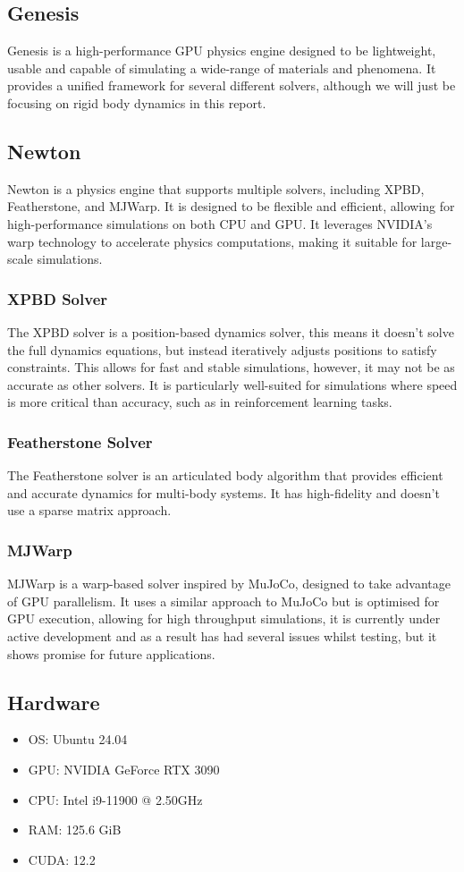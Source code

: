 \documentclass[11pt,a4paper]{article}
\begin{document}
\subsection{Genesis}
Genesis is a high-performance GPU physics engine designed to be lightweight, usable and capable of simulating a wide-range of materials and phenomena. It provides a unified framework for several different solvers, although we will just be focusing on rigid body dynamics in this report. 

\subsection{Newton}
Newton is a physics engine that supports multiple solvers, including XPBD, Featherstone, and MJWarp. It is designed to be flexible and efficient, allowing for high-performance simulations on both CPU and GPU. It leverages NVIDIA's warp technology to accelerate physics computations, making it suitable for large-scale simulations.
\subsubsection{XPBD Solver}
The XPBD solver is a position-based dynamics solver, this means it doesn't solve the full dynamics equations, but instead iteratively adjusts positions to satisfy constraints. This allows for fast and stable simulations, however, it may not be as accurate as other solvers. It is particularly well-suited for simulations where speed is more critical than accuracy, such as in reinforcement learning tasks.
\subsubsection{Featherstone Solver}
The Featherstone solver is an articulated body algorithm that provides efficient and accurate dynamics for multi-body systems. It has high-fidelity and doesn't use a sparse matrix approach.
\subsubsection{MJWarp}
MJWarp is a warp-based solver inspired by MuJoCo, designed to take advantage of GPU parallelism. It uses a similar approach to MuJoCo but is optimised for GPU execution, allowing for high throughput simulations, it is currently under active development and as a result has had several issues whilst testing, but it shows promise for future applications.

\subsection{Hardware}
\begin{itemize}
    \item OS: Ubuntu 24.04
    \item GPU: NVIDIA GeForce RTX 3090 
    \item CPU: Intel i9-11900 @ 2.50GHz
    \item RAM: 125.6 GiB
    \item CUDA: 12.2
\end{itemize}
\end{document}

